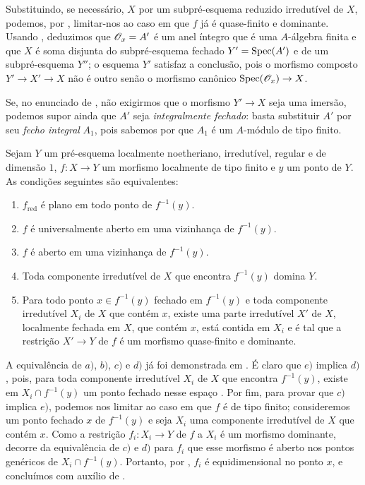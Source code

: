 Substituindo, se necessário, $X$ por um subpré-esquema reduzido irredutível de $X$, podemos, por , limitar-nos ao caso em que $f$ já é quase-finito e dominante.
Usando , deduzimos que $\mathscr{O}_x=A'$ é um anel íntegro que é uma $A$-álgebra finita e que $X$ é soma disjunta do subpré-esquema fechado $Y'=\operatorname{Spec}(A')$ e de um subpré-esquema $Y''$; o esquema $Y'$ satisfaz a conclusão, pois o morfismo composto $Y'\to X'\to X$ não é outro senão o morfismo canônico $\Spec(\sh{O}_x)\to X$.

\begin{remark}[14.5.5]
\label{IV.14.5.5}
Se, no enunciado de , não exigirmos que o morfismo $Y'\to X$ seja uma imersão, podemos supor ainda que $A'$ seja \emph{integralmente fechado}: basta substituir $A'$ por seu \emph{fecho integral} $A_1$, pois sabemos por  que $A_1$ é um $A$-módulo de tipo finito.
\end{remark}

\begin{proposition}[14.5.6]
\label{IV.14.5.6}
Sejam $Y$ um pré-esquema localmente noetheriano, irredutível, regular e de dimensão $1$, $f:X\to Y$ um morfismo localmente de tipo finito e $y$ um ponto de $Y$.
As condições seguintes são equivalentes:
\begin{enumerate}[label=\emph{\alph*)}]
  \item $f_{\mathrm{red}}$ é plano em todo ponto de $f^{-1}(y)$.


  \item $f$ é universalmente aberto em uma vizinhança de $f^{-1}(y)$.
  \item $f$ é aberto em uma vizinhança de $f^{-1}(y)$.
  \item Toda componente irredutível de $X$ que encontra $f^{-1}(y)$ domina $Y$.
  \item Para todo ponto $x\in f^{-1}(y)$ fechado em $f^{-1}(y)$ e toda componente irredutível $X_i$ de $X$ que contém $x$, existe uma parte irredutível $X'$ de $X$, localmente fechada em $X$, que contém $x$, está contida em $X_i$ e é tal que a restrição $X'\to Y$ de $f$ é um morfismo quase-finito e dominante.
\end{enumerate}
\end{proposition}

A equivalência de $a)$, $b)$, $c)$ e $d)$ já foi demonstrada em .
É claro que $e)$ implica $d)$, pois, para toda componente irredutível $X_i$ de $X$ que encontra $f^{-1}(y)$, existe em $X_i\cap f^{-1}(y)$ um ponto fechado nesse espaço .
Por fim, para provar que $c)$ implica $e)$, podemos nos limitar ao caso em que $f$ é de tipo finito; consideremos um ponto fechado $x$ de $f^{-1}(y)$ e seja $X_i$ uma componente irredutível de $X$ que contém $x$.
Como a restrição $f_i:X_i\to Y$ de $f$ a $X_i$ é um morfismo dominante, decorre da equivalência de $c)$ e $d)$ para $f_i$ que esse morfismo é aberto nos pontos genéricos de $X_i\cap f^{-1}(y)$.
Portanto, por , $f_i$ é equidimensional no ponto $x$, e concluímos com auxílio de .

